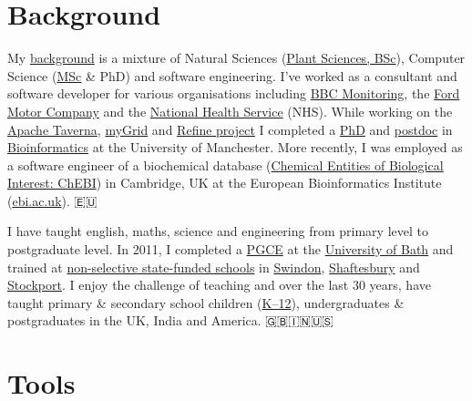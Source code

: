 \documentclass[12pt,]{book}
\begin{document}
\hypertarget{background}{%
\section*{Background}\label{background}}

My \href{https://uk.linkedin.com/in/duncanhull}{background} is a mixture of Natural Sciences (\href{http://www.plantsciences.manchester.ac.uk/}{Plant Sciences, BSc}), Computer Science (\href{http://www.cs.man.ac.uk/~hulld/msc2003.html}{MSc} \& PhD) and software engineering. I've worked as a consultant and software developer for various organisations including \href{https://en.wikipedia.org/wiki/BBC_Monitoring}{BBC Monitoring}, the \href{https://en.wikipedia.org/wiki/Ford_Motor_Company}{Ford Motor Company} and the \href{https://en.wikipedia.org/wiki/National_Health_Service}{National Health Service} (NHS). While working on the \href{https://en.wikipedia.org/wiki/Apache_Taverna}{Apache Taverna}, \href{https://en.wikipedia.org/wiki/MyGrid}{myGrid} and \href{http://www.nactem.ac.uk/pathtext/}{Refine project} I completed a \href{https://ethos.bl.uk/OrderDetails.do?uin=uk.bl.ethos.497578}{PhD} and \href{https://en.wikipedia.org/wiki/Postdoctoral_researcher}{postdoc} in \href{https://en.wikipedia.org/wiki/Bioinformatics}{Bioinformatics} at the University of Manchester. More recently, I was employed as a software engineer of a biochemical database (\href{https://www.ebi.ac.uk/chebi/}{Chemical Entities of Biological Interest: ChEBI}) in Cambridge, UK at the European Bioinformatics Institute (\href{https://www.ebi.ac.uk}{ebi.ac.uk}). 🇪🇺

I have taught english, maths, science and engineering from primary level to postgraduate level. In 2011, I completed a \href{https://en.wikipedia.org/wiki/Postgraduate_Certificate_in_Education}{PGCE} at the \href{https://www.bath.ac.uk/}{University of Bath} and trained at \href{https://en.wikipedia.org/wiki/State-funded_schools_(England)}{non-selective state-funded schools} in \href{https://www.lydiardparkacademy.org.uk/}{Swindon}, \href{https://shaftesburyschool.co.uk/}{Shaftesbury} and \href{https://www.st-annes.stockport.sch.uk/}{Stockport}. I enjoy the challenge of teaching and over the last 30 years, have taught primary \& secondary school children (\href{https://en.wikipedia.org/wiki/K\%E2\%80\%9312}{K--12}), undergraduates \& postgraduates in the UK, India and America. 🇬🇧🇮🇳🇺🇸

\hypertarget{tools}{%
\section*{Tools}\label{tools}}
\end{document}
